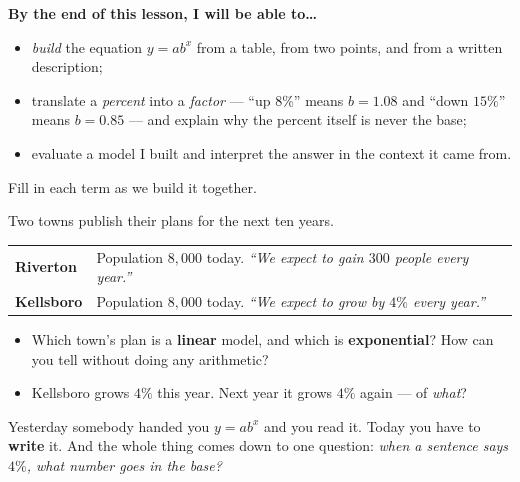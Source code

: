 \documentclass[10pt]{article}
\begin{document}
\namedateperiod

\vspace{0.08in}

\begin{objectivebox}
\textbf{By the end of this lesson, I will be able to\dots}
\begin{itemize}\setlength{\itemsep}{2pt}
  \item \emph{build} the equation $y=ab^{x}$ from a table, from two points, and from a written description;
  \item translate a \emph{percent} into a \emph{factor} --- ``up $8\%$'' means $b=1.08$ and ``down $15\%$'' means $b=0.85$ --- and explain why the percent itself is never the base;
  \item evaluate a model I built and interpret the answer in the context it came from.
\end{itemize}
\end{objectivebox}

\vspace{0.05in}

\begin{vocabbox}
\small
Fill in each term as we build it together.
\par\vspace{2pt}   %
\end{vocabbox}

\begin{hookbox}
Two towns publish their plans for the next ten years.
\begin{center}
\small
\renewcommand{\arraystretch}{1.25}
\begin{tabularx}{0.92\linewidth}{@{}l X@{}}
\hline
\textbf{Riverton} & Population $8{,}000$ today. \emph{``We expect to gain $300$ people every year.''} \\
\textbf{Kellsboro} & Population $8{,}000$ today. \emph{``We expect to grow by $4\%$ every year.''} \\
\hline
\end{tabularx}
\end{center}
\begin{itemize}\setlength{\itemsep}{1pt}
  \item Which town's plan is a \textbf{linear} model, and which is \textbf{exponential}? How can you tell without doing any arithmetic? \writeline
  \item Kellsboro grows $4\%$ this year. Next year it grows $4\%$ again --- of \emph{what}? \writeline
\end{itemize}
Yesterday somebody handed you $y=ab^{x}$ and you read it. Today you have to \textbf{write} it. And the
whole thing comes down to one question: \emph{when a sentence says $4\%$, what number goes in the base?}
\end{hookbox}
\end{document}
